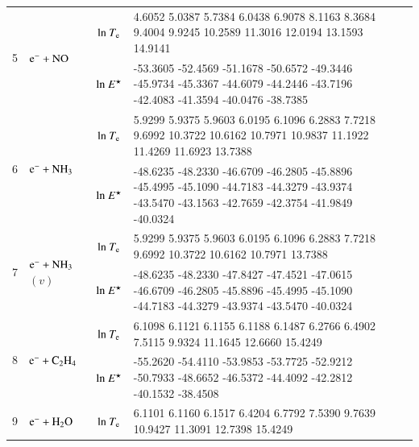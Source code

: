 \begin{table}[!htbp]
\begin{threeparttable}
\begin{tabular*}{\textwidth}{l@{\extracolsep{\fill}}lcll}
  \\     
  \midrule  
  
  \multirow{2}{*}{5} &  \multirow{2}{*}{ $\rm e^- + NO  $   } & ${\rm ln}~T_{\rm e}$  & \tiny    4.6052    5.0387    5.7384    6.0438    6.9078    8.1163    8.3684    9.4004    9.9245   10.2589   11.3016   12.0194   13.1593   14.9141
 \\
  &  & ${\rm ln}~E^\star$     & \tiny    -53.3605  -52.4569  -51.1678  -50.6572  -49.3446  -45.9734  -45.3367  -44.6079  -44.2446  -43.7196  -42.4083  -41.3594  -40.0476  -38.7385
  \\     
  \midrule  
        
  \multirow{2}{*}{6} &  \multirow{2}{*}{ $\rm e^- + NH_3  $   } & ${\rm ln}~T_{\rm e}$  & \tiny  5.9299    5.9375    5.9603    6.0195    6.1096    6.2883    7.7218    9.6992   10.3722   10.6162   10.7971   10.9837   11.1922   11.4269   11.6923      13.7388   \\
  
  &  & ${\rm ln}~E^\star$     & \tiny     -48.6235  -48.2330  -46.6709  -46.2805  -45.8896  -45.4995  -45.1090  -44.7183  -44.3279  -43.9374  -43.5470  -43.1563  -42.7659  -42.3754  -41.9849 
 -40.0324  \\
    \midrule  
  \multirow{2}{*}{7} &  \multirow{2}{*}{ $\rm e^- + NH_3$$(v)$   } & ${\rm ln}~T_{\rm e}$  & \tiny    5.9299    5.9375    5.9603    6.0195    6.1096    6.2883    7.7218    9.6992   10.3722   10.6162   10.7971         13.7388
  \\
  
  &  & ${\rm ln}~E^\star$     & \tiny     -48.6235  -48.2330  -47.8427  -47.4521  -47.0615  -46.6709  -46.2805  -45.8896  -45.4995  -45.1090  -44.7183  -44.3279  -43.9374  -43.5470    -40.0324
  \\  
  
    \midrule  
  \multirow{2}{*}{8} &  \multirow{2}{*}{ $\rm e^- + C_2 H_4$   } & ${\rm ln}~T_{\rm e}$  & \tiny         6.1098    6.1121    6.1155    6.1188    6.1487    6.2766    6.4902    7.5115    9.9324   11.1645   12.6660   15.4249
  \\
  
  &  & ${\rm ln}~E^\star$     & \tiny       -55.2620  -54.4110  -53.9853  -53.7725  -52.9212  -50.7933  -48.6652  -46.5372  -44.4092  -42.2812  -40.1532  -38.4508
  \\  
  
    \midrule  
  \multirow{2}{*}{9} &  \multirow{2}{*}{ $\rm e^- + H_2 O$   } & ${\rm ln}~T_{\rm e}$  & \tiny         6.1101    6.1160    6.1517    6.4204    6.7792    7.5390    9.7639   10.9427   11.3091   12.7398   15.4249
  \\
  

\end{tabular*}
\end{threeparttable}
\end{table}
